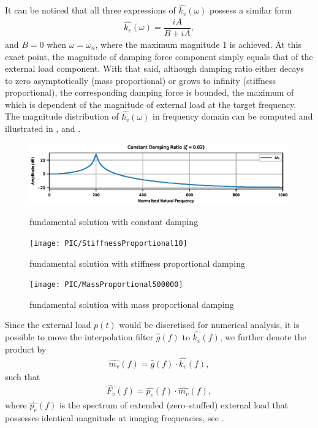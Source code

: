 It can be noticed that all three expressions of $\hat{k_v}\left(\omega\right)$ possess a similar form
\begin{gather}\label{eq:general_damping_force}
\hat{k_v}\left(\omega\right)=\dfrac{iA}{B+iA},
\end{gather}
and $B=0$ when $\omega=\omega_n$, where the maximum magnitude \num{1} is achieved. At this exact point, the magnitude of damping force component simply equals that of the external load component. With that said, although damping ratio either decays to zero asymptotically (mass proportional) or grows to infinity (stiffness proportional), the corresponding damping force is bounded, the maximum of which is dependent of the magnitude of external load at the target frequency. The magnitude distribution of $\hat{k_v}\left(\omega\right)$ in frequency domain can be computed and illustrated in ,  and .
\begin{figure}[htb!]
\centering
\includegraphics{PIC/ConstantProportional2000}
\caption{fundamental solution with constant damping}\label{fig:constant_damping}
\texttt{[image: PIC/StiffnessProportional10]}
\caption{fundamental solution with stiffness proportional damping}\label{fig:k_proportional}
\texttt{[image: PIC/MassProportional500000]}
\caption{fundamental solution with mass proportional damping}\label{fig:m_proportional}
\end{figure}

Since the external load $p\left(t\right)$ would be discretised for numerical analysis, it is possible to move the interpolation filter $\hat{g}\left(f\right)$ to $\hat{k_v}\left(f\right)$, we further denote the product by
\begin{gather}
\hat{m_v}\left(f\right)=\hat{g}\left(f\right)\cdot\hat{k_v}\left(f\right),
\end{gather}
such that
\begin{gather}
\hat{F_v}\left(f\right)=\hat{p_e}\left(f\right)\cdot\hat{m_v}\left(f\right),
\end{gather}
where $\hat{p_e}\left(f\right)$ is the spectrum of extended (zero--stuffed) external load that possesses identical magnitude at imaging frequencies, see .

